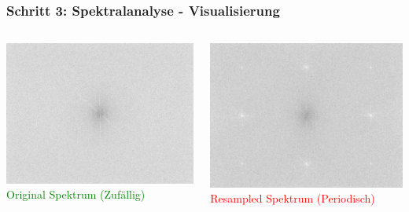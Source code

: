 \documentclass[11pt,t,usepdftitle=false,aspectratio=169]{beamer}
\begin{document}
\begin{frame}
	\frametitle{Schritt 3: Spektralanalyse - Visualisierung}
	
	\begin{columns}[T]
		\begin{column}{0.48\textwidth}
			\includegraphics[width=\textwidth]{images/examples_unedited/spectrum.png}
			\textcolor{green}{\small Original Spektrum (Zufällig)}
		\end{column}
		\begin{column}{0.48\textwidth}
			\includegraphics[width=\textwidth]{images/examples_edited/spectrum.png}
			\textcolor{red}{\small Resampled Spektrum (Periodisch)}
		\end{column}
	\end{columns}
\end{frame}
\end{document}
